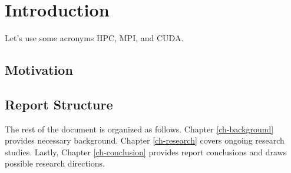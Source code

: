 
\chapter{Introduction} 
\label{ch-introduction}

\lipsum[1-2]

Let's use some acronyms \gls{HPC}, \gls{MPI}, and \gls{CUDA}.

\section{Motivation}
\label{sec-motivation}

\lipsum[2-4]

\section{Report Structure}
\label{sec-report}

The rest of the document is organized as follows. Chapter \ref{ch-background} provides necessary background. Chapter \ref{ch-research} covers ongoing research studies. Lastly, Chapter \ref{ch-conclusion} provides report conclusions and draws possible research directions.